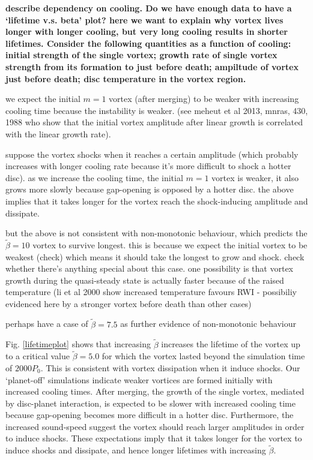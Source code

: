 {\bf describe dependency on
cooling. Do we have enough data to have a `lifetime v.s. beta'
  plot? here we want to explain why vortex lives longer with longer
  cooling, but very long cooling results in shorter lifetimes. 
  Consider the following quantities as a function of cooling:
  initial strength of the single vortex; growth rate of single vortex
  strength from its formation to just before death; ampiltude of
  vortex just before death; disc temperature in the vortex region. 

  we expect the initial $m=1$ vortex (after merging) to be weaker with
  increasing cooling time because the instability is weaker. (see
  meheut et al 2013, mnras, 430, 1988 who show that the initial vortex
  amplitude after linear growth is correlated with the linear growth
  rate). 

  suppose the vortex shocks when it reaches a certain amplitude (which
  probably increases with longer cooling rate because it's more
  difficult to shock a hotter disc). as we
  increase the cooling time, the initial $m=1$ vortex is weaker, it
  also grows more slowly because gap-opening is opposed by a hotter
  disc. the above implies that it takes longer for the vortex reach
  the shock-inducing amplitude and dissipate.  

  but the above is not consistent with non-monotonic behaviour, which
  predicts the $\tilde{\beta}=10$ vortex to survive longest. this is
  because we expect the initial vortex to be weakest (check) which
  means it should take the longest to grow and shock. check
  whether there's anything special about this case. one possibility is
  that vortex growth during the quasi-steady state is actually faster
  because of the raised temperature (li et al 2000 show increased
  temperature favours RWI - possibiliy evidenced here by a stronger
  vortex before death than other cases) 

  perhaps have a case of $\tilde{\beta}=7.5$ as further evidence of
  non-monotonic behaviour
}

Fig. \ref{lifetimeplot} shows that increasing $\tilde{\beta}$
increases the lifetime of the vortex up to a critical 
value $\tilde{\beta}=5.0$ for which the vortex lasted beyond the
simulation time of $2000P_0$. This is consistent with vortex
dissipation when it induce shocks. Our `planet-off' simulations
indicate weaker vortices are formed initially with increased cooling
times. After merging, the growth of the single vortex, mediated by disc-planet
interaction, is expected to be slower with increased cooling time
because gap-opening becomes more difficult in a hotter
disc. Furthermore, the increased sound-speed suggest the vortex should
reach larger amplitudes in order to induce shocks. 
These expectations
imply that it takes longer for the vortex to induce shocks and
dissipate, and hence longer lifetimes with increasing
$\tilde{\beta}$. 

